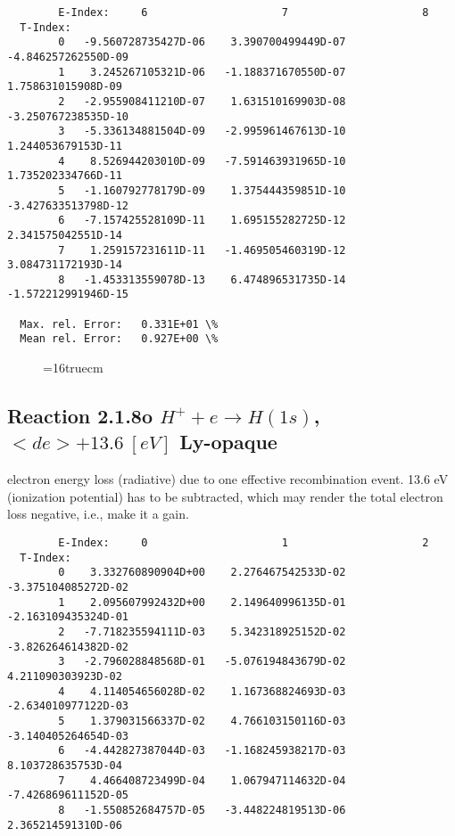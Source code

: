 \documentclass[12pt,dvipdfmx]{article}
\begin{document}
{\begin{small}
\begin{verbatim}
        E-Index:     6                     7                     8
  T-Index:
        0   -9.560728735427D-06    3.390700499449D-07   -4.846257262550D-09
        1    3.245267105321D-06   -1.188371670550D-07    1.758631015908D-09
        2   -2.955908411210D-07    1.631510169903D-08   -3.250767238535D-10
        3   -5.336134881504D-09   -2.995961467613D-10    1.244053679153D-11
        4    8.526944203010D-09   -7.591463931965D-10    1.735202334766D-11
        5   -1.160792778179D-09    1.375444359851D-10   -3.427633513798D-12
        6   -7.157425528109D-11    1.695155282725D-12    2.341575042551D-14
        7    1.259157231611D-11   -1.469505460319D-12    3.084731172193D-14
        8   -1.453313559078D-13    6.474896531735D-14   -1.572212991946D-15

  Max. rel. Error:   0.331E+01 \%
  Mean rel. Error:   0.927E+00 \%

\end{verbatim}\end{small}
\begin{figure} \label{2.1.8lr2}
\epsfxsize=16truecm
\end{figure}
\newpage




\subsection{
  Reaction 2.1.8o $H^+ + e \rightarrow H(1s) $, \ $ <de> + 13.6 \ [eV] $
  Ly-opaque
}

  electron energy loss (radiative) due to one effective recombination event.
  13.6 eV (ionization potential) has to be
  subtracted, which may render the total electron loss negative, i.e., make it a gain.

\begin{small}\begin{verbatim}
        E-Index:     0                     1                     2
  T-Index:
        0    3.332760890904D+00    2.276467542533D-02   -3.375104085272D-02
        1    2.095607992432D+00    2.149640996135D-01   -2.163109435324D-01
        2   -7.718235594111D-03    5.342318925152D-02   -3.826264614382D-02
        3   -2.796028848568D-01   -5.076194843679D-02    4.211090303923D-02
        4    4.114054656028D-02    1.167368824693D-03   -2.634010977122D-03
        5    1.379031566337D-02    4.766103150116D-03   -3.140405264654D-03
        6   -4.442827387044D-03   -1.168245938217D-03    8.103728635753D-04
        7    4.466408723499D-04    1.067947114632D-04   -7.426869611152D-05
        8   -1.550852684757D-05   -3.448224819513D-06    2.365214591310D-06


\end{verbatim}
\end{small}}
\end{document}
